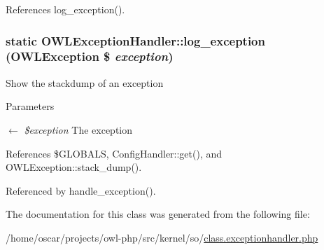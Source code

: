 References log\_\-exception().

\subsubsection[{log\_\-exception}]{\setlength{\rightskip}{0pt plus 5cm}static OWLExceptionHandler::log\_\-exception ({\bf OWLException} \$ {\em exception})}\label{classOWLExceptionHandler_a760bf3e7d648a7714abf5720f39369d8}
Show the stackdump of an exception 
\begin{DoxyParams}{Parameters}
\item[\mbox{$\leftarrow$} {\em \$exception}]The exception \end{DoxyParams}


References \$GLOBALS, ConfigHandler::get(), and OWLException::stack\_\-dump().



Referenced by handle\_\-exception().



The documentation for this class was generated from the following file:\begin{DoxyCompactItemize}
\item 
/home/oscar/projects/owl-\/php/src/kernel/so/\hyperlink{class_8exceptionhandler_8php}{class.exceptionhandler.php}\end{DoxyCompactItemize}
